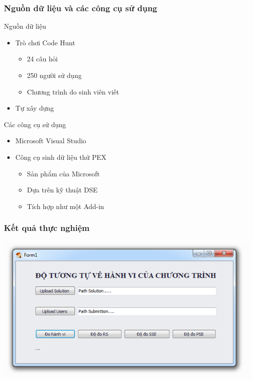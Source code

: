\documentclass{beamer}
\begin{document}
\begin{frame}
  \frametitle{Nguồn dữ liệu và các công cụ sử dụng}
  \begin{block}{Nguồn dữ liệu}
  	\begin{itemize}
  		\item Trò chơi Code Hunt
  		\begin{itemize}
  			\item 24 câu hỏi
  			\item 250 người sử dụng
  			\item Chương trình do sinh viên viết
  		\end{itemize}
  		\item Tự xây dựng
  	\end{itemize}
  \end{block} \pause
  \begin{block}{Các công cụ sử dụng}
  	\begin{itemize}
  		\item Microsoft Visual Studio
  		\item Công cụ sinh dữ liệu thử PEX
  		\begin{itemize}
  			\item Sản phẩm của Microsoft
  			\item Dựa trên kỹ thuật DSE
  			\item Tích hợp như một Add-in
  		\end{itemize}
  	\end{itemize}
  \end{block}
\end{frame}

\begin{frame}
  \frametitle{Kết quả thực nghiệm}
  \centering
  \includegraphics[width=0.8\linewidth]{images/main.png}
  
\end{frame}
\end{document}
